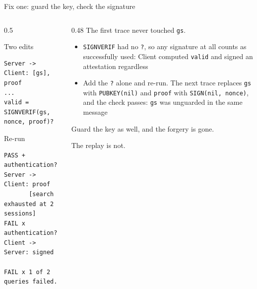 \ifdefined\PRESENTATION\else\PassOptionsToClass{handout}{beamer}\fi\documentclass[aspectratio=169, lualatex]{beamer}
\begin{document}
\begin{frame}[fragile]{Fix one: guard the key, check the signature}
	\begin{columns}[t]
		\begin{column}{0.5\textwidth}
			\begin{vpmodel}{Two edits}
				\begin{lstlisting}
Server -> Client: [gs], proof
...
valid = SIGNVERIF(gs, nonce, proof)?
\end{lstlisting}
			\end{vpmodel}
			\vspace{0.4em}
			\begin{vpresult}{Re-run}
				\begin{lstlisting}
PASS + authentication? Server -> Client: proof
       [search exhausted at 2 sessions]
FAIL x authentication? Client -> Server: signed

FAIL x 1 of 2 queries failed.
\end{lstlisting}
			\end{vpresult}
		\end{column}
		\begin{column}{0.48\textwidth}
			\small
			The first trace never touched \texttt{gs}.
			\vspace{0.3em}
			\begin{itemize}
				\item \texttt{SIGNVERIF} had no \texttt{?}, so any signature at all counts as successfully used: Client computed \texttt{valid} and signed an attestation regardless
				\item Add the \texttt{?} alone and re-run. The next trace replaces \texttt{gs} with \texttt{PUBKEY(nil)} and \texttt{proof} with \texttt{SIGN(nil, nonce)}, and the check passes: \texttt{gs} was unguarded in the same message
			\end{itemize}
			\vspace{0.3em}
			Guard the key as well, and the forgery is gone.

			The replay is not.
		\end{column}
	\end{columns}
\end{frame}
\end{document}
